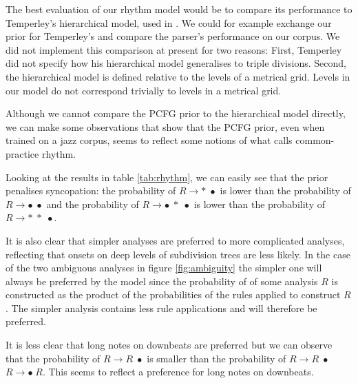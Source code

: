 

The best evaluation of our rhythm model would be to compare its performance to Temperley's hierarchical model, used in \citep{temperley2009unified}. We could for example exchange our prior for Temperley's and compare the parser's  performance on our corpus. We did not implement this comparison at present for two reasons: First, Temperley did not specify how his hierarchical model generalises to triple divisions. Second, the hierarchical model is defined relative to the levels of a metrical grid. Levels in our model do not correspond trivially to levels in a metrical grid. 

Although we cannot compare the PCFG prior to the hierarchical model directly, we can make some observations that show that the PCFG prior, even when trained on a jazz corpus, seems to reflect some notions of what \citet{temperley2010modeling} calls common-practice rhythm. 

Looking at the results in table \ref{tab:rhythm}, we can easily see that the prior penalises syncopation: the probability of $R \rightarrow *\; \bullet$ is lower than the probability of $R \rightarrow \bullet\; \bullet$ and the probability of $R \rightarrow \bullet\; *\; \bullet$ is lower than the probability of $R \rightarrow *\; *\; \bullet$.

It is also clear that simpler analyses are preferred to more complicated analyses, reflecting that onsets on deep levels of subdivision trees are less likely. In the case of the two ambiguous analyses in figure \ref{fig:ambiguity} the simpler one will always be preferred by the model since the probability of of some analysis $R$ is constructed as the product of the probabilities of the rules applied to construct $R$. The simpler analysis contains less rule applications and will therefore be preferred.

It is less clear that long notes on downbeats are preferred but we can observe that the probability of $R \rightarrow R \; \bullet$ is smaller than the probability of $R \rightarrow R \; \bullet$ $R \rightarrow \bullet\; R$. This seems to reflect a preference for long notes on downbeats.

